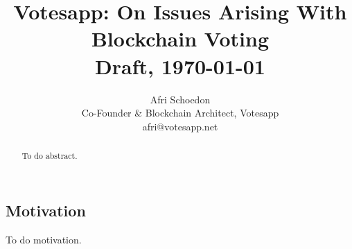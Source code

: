 \documentclass[9pt,oneside]{amsart}
\title{Votesapp: On Issues Arising With Blockchain Voting \\ {\smaller \textbf{Draft}, \today}}
\author{
    Afri Schoedon\\
    Co-Founder \& Blockchain Architect, Votesapp\\
    afri@votesapp.net
}
\providecommand{\toReview}[1]{{\color{initial}#1}}
\begin{document}
\pagecolor{lightblue}

\begin{abstract}
\toReview{To do abstract.}
\end{abstract}

\maketitle

\setlength{\columnsep}{20pt}
\begin{multicols}{2}

\section{Motivation}\label{sec:motivation}

\toReview{To do motivation. \lipsum}

\end{multicols}
\end{document}
